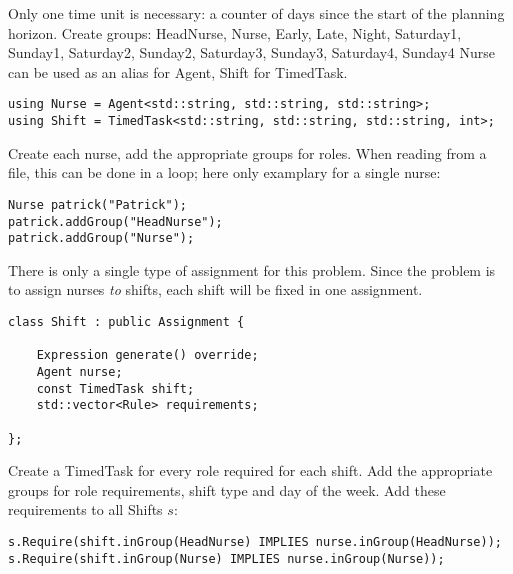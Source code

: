 
Only one time unit is necessary: a counter of days since the start of the planning horizon.
Create groups: HeadNurse, Nurse, Early, Late, Night, Saturday1, Sunday1, Saturday2, Sunday2, Saturday3, Sunday3, Saturday4, Sunday4
Nurse can be used as an alias for Agent, Shift for TimedTask.

\begin{verbatim}
using Nurse = Agent<std::string, std::string, std::string>;
using Shift = TimedTask<std::string, std::string, std::string, int>;
\end{verbatim}

Create each nurse, add the appropriate groups for roles. When reading from a file, this can be done in a loop; here only examplary for a single nurse:
\begin{verbatim}
Nurse patrick("Patrick");
patrick.addGroup("HeadNurse");
patrick.addGroup("Nurse");
\end{verbatim}

There is only a single type of assignment for this problem. Since the problem is to assign nurses \textit{to} shifts, each shift will be fixed in one assignment.
\begin{verbatim}
class Shift : public Assignment {

	Expression generate() override;
	Agent nurse;
	const TimedTask shift;
	std::vector<Rule> requirements; 

}; 
\end{verbatim}

Create a TimedTask for every role required for each shift. Add the appropriate groups for role requirements, shift type and day of the week.
Add these requirements to all Shifts $s$: 
\begin{verbatim}
s.Require(shift.inGroup(HeadNurse) IMPLIES nurse.inGroup(HeadNurse));
s.Require(shift.inGroup(Nurse) IMPLIES nurse.inGroup(Nurse));
\end{verbatim}


